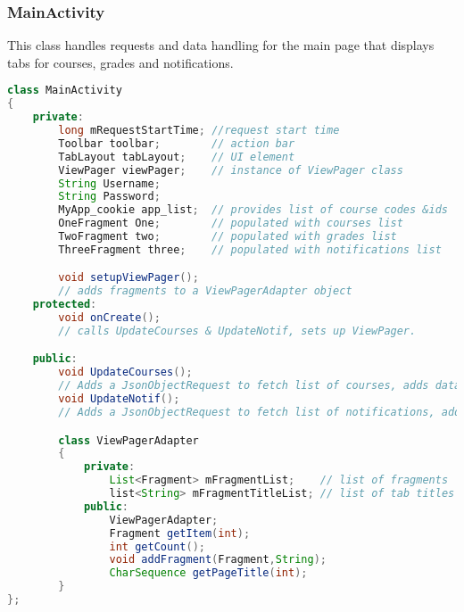 \documentclass{article}
\begin{document}
\subsubsection{MainActivity}
\par\noindent This class handles requests and data handling for the main page that displays tabs for courses, grades and notifications.
\begin{lstlisting}[language=Java, caption={Fields \& Methods of MainActivity}]
class MainActivity
{
	private:
		long mRequestStartTime; //request start time
		Toolbar toolbar;		// action bar
		TabLayout tabLayout;	// UI element
		ViewPager viewPager;	// instance of ViewPager class
		String Username;		
		String Password;
		MyApp_cookie app_list;	// provides list of course codes &ids
		OneFragment One;		// populated with courses list
		TwoFragment two;		// populated with grades list
		ThreeFragment three;	// populated with notifications list

		void setupViewPager();	
		// adds fragments to a ViewPagerAdapter object
	protected:
		void onCreate();		
		// calls UpdateCourses & UpdateNotif, sets up ViewPager.

	public:
		void UpdateCourses();
		// Adds a JsonObjectRequest to fetch list of courses, adds data to a bundle to be passed to One.
		void UpdateNotif();
		// Adds a JsonObjectRequest to fetch list of notifications, adds data to a bundle to be passed to three.

		class ViewPagerAdapter
		{
			private:
				List<Fragment> mFragmentList; 	 // list of fragments
				list<String> mFragmentTitleList; // list of tab titles
			public:
				ViewPagerAdapter;
				Fragment getItem(int);
				int getCount();
				void addFragment(Fragment,String);
				CharSequence getPageTitle(int);
		}
};
\end{lstlisting}
\end{document}
